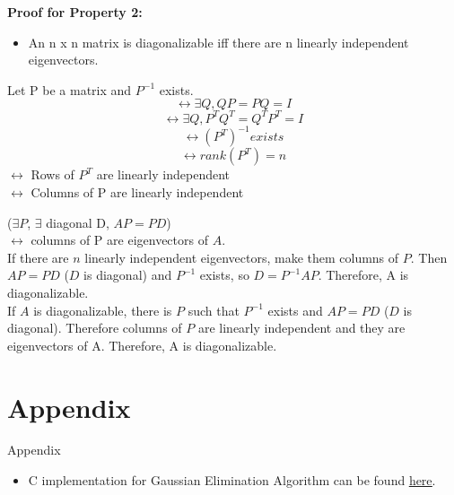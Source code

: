 \documentclass{beamer}
\begin{document}
\begin{frame}
\textbf{Proof for Property 2:}
\begin{itemize}
    \item An n x n matrix is diagonalizable iff there are n linearly independent eigenvectors.
\end{itemize}

Let P be a matrix and $P^{-1}$ exists.
\begin{equation}
    \leftrightarrow \exists Q, QP = PQ = I
\end{equation}
\begin{equation}
    \leftrightarrow \exists Q, P^{T}Q^{T} = Q^{T}P^{T} = I
\end{equation}
\begin{equation}
    \leftrightarrow (P^{T})^{-1} exists
\end{equation}
\begin{equation}
    \leftrightarrow rank(P^{T}) = n
\end{equation}
\vspace{10}
$\leftrightarrow$ Rows of $P^{T}$ are linearly independent\\

$\leftrightarrow$ Columns of P are linearly independent

\end{frame}

\begin{frame}
    ($\exists P$, $\exists$ diagonal D, $AP = PD$) \\
    \hspace{60}$\leftrightarrow$ columns of P are eigenvectors of $A$.\\
    \vspace{10}
    If there are $n$ linearly independent eigenvectors, make them columns of $P$. Then $AP = PD$ ($D$ is diagonal) and $P^{-1}$ exists, so $D = P^{-1}AP$. Therefore, A is diagonalizable.\\
    \vspace{10}
    If $A$ is diagonalizable, there is $P$ such that $P^{-1}$ exists and $AP = PD$ ($D$ is diagonal). Therefore columns of $P$ are linearly independent and they are eigenvectors of A. Therefore, A is diagonalizable.
\end{frame}
\section{Appendix}
\begin{frame}{Appendix}
    \begin{itemize}
        \item{C implementation for Gaussian Elimination Algorithm can be found 
        \href{https://github.com/AbdurNawaz/C-Data-Structures/tree/main/Assignment-1/codes/ee18btech11052.c}{\uline{here}}.}
    \end{itemize}
    
\end{frame}
\end{document}
